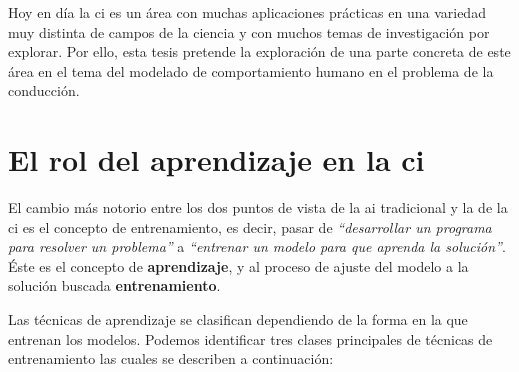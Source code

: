 
Hoy en día la \gls{ci} es un área con muchas aplicaciones prácticas en una variedad muy distinta de campos de la ciencia y con muchos temas de investigación por explorar. Por ello, esta tesis pretende la exploración de una parte concreta de este área en el tema del modelado de comportamiento humano en el problema de la conducción.

\section{El rol del aprendizaje en la \acrlong{ci}}
\label{s:the-learning-role}

El cambio más notorio entre los dos puntos de vista de la \gls{ai} tradicional y la de la \gls{ci} es el concepto de entrenamiento, es decir, pasar de \textit{\enquote{desarrollar un programa para resolver un problema}} a \textit{\enquote{entrenar un modelo para que aprenda la solución}}. Éste es el concepto de \textbf{aprendizaje}, y al proceso de ajuste del modelo a la solución buscada \textbf{entrenamiento}.

Las técnicas de aprendizaje se clasifican dependiendo de la forma en la que entrenan los modelos. Podemos identificar tres clases principales de técnicas de entrenamiento las cuales se describen a continuación:

